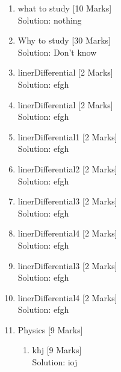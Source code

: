 \documentclass[10pt]{article}
\begin{document}
\pagebreak\begin{enumerate}\item what to study\hfill
[10 Marks]
\\Solution: nothing\\\vspace*{10pt}\item Why to study\hfill
[30 Marks]
\\Solution: Don't know\\\vspace*{10pt}\item linerDifferential\hfill
[2 Marks]
\\Solution: efgh\\\vspace*{10pt}\item linerDifferential\hfill
[2 Marks]
\\Solution: efgh\\\vspace*{10pt}\item linerDifferential1\hfill
[2 Marks]
\\Solution: efgh\\\vspace*{10pt}\item linerDifferential2\hfill
[2 Marks]
\\Solution: efgh\\\vspace*{10pt}\item linerDifferential3\hfill
[2 Marks]
\\Solution: efgh\\\vspace*{10pt}\item linerDifferential4\hfill
[2 Marks]
\\Solution: efgh\\\vspace*{10pt}\item linerDifferential3\hfill
[2 Marks]
\\Solution: efgh\\\vspace*{10pt}\item linerDifferential4\hfill
[2 Marks]
\\Solution: efgh\\\vspace*{10pt}\item Physics\hfill
[9 Marks]
\begin{enumerate}\item khj\hfill
[9 Marks]
\\Solution: ioj\\\vspace*{10pt}\end{enumerate}
\end{enumerate}
\end{document}
